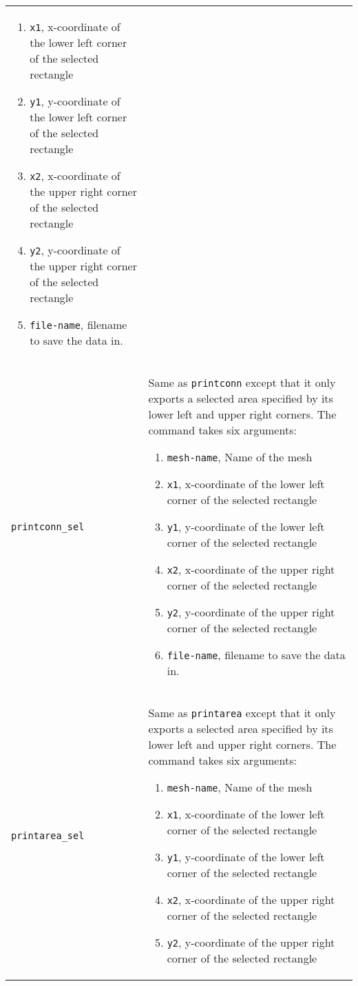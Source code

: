 \documentclass[noshowpacs,preprintnumbers,amsmath,amssymb, letter]{revtex4}
\begin{document}
\begin{longtable}{p{}p{}}
\begin{enumerate}
\item \texttt{x1}, x-coordinate of the lower left corner of the selected rectangle
\item \texttt{y1}, y-coordinate of the lower left corner of the selected rectangle
\item \texttt{x2}, x-coordinate of the upper right corner of the selected rectangle
\item \texttt{y2}, y-coordinate of the upper right corner of the selected rectangle
\item \texttt{file-name}, filename to save the data in.
\end{enumerate}\\
\texttt{printconn\_sel}	& Same as \texttt{printconn} except that it only exports a selected area specified by its lower left and upper right corners. The command takes six arguments:
\begin{enumerate}
\item \texttt{mesh-name}, Name of the mesh
\item \texttt{x1}, x-coordinate of the lower left corner of the selected rectangle
\item \texttt{y1}, y-coordinate of the lower left corner of the selected rectangle
\item \texttt{x2}, x-coordinate of the upper right corner of the selected rectangle
\item \texttt{y2}, y-coordinate of the upper right corner of the selected rectangle
\item \texttt{file-name}, filename to save the data in.
\end{enumerate}\\
\texttt{printarea\_sel}	& Same as \texttt{printarea} except that it only exports a selected area specified by its lower left and upper right corners. The command takes six arguments:
\begin{enumerate}
\item \texttt{mesh-name}, Name of the mesh
\item \texttt{x1}, x-coordinate of the lower left corner of the selected rectangle
\item \texttt{y1}, y-coordinate of the lower left corner of the selected rectangle
\item \texttt{x2}, x-coordinate of the upper right corner of the selected rectangle
\item \texttt{y2}, y-coordinate of the upper right corner of the selected rectangle

\end{enumerate}
\end{longtable}
\end{document}
